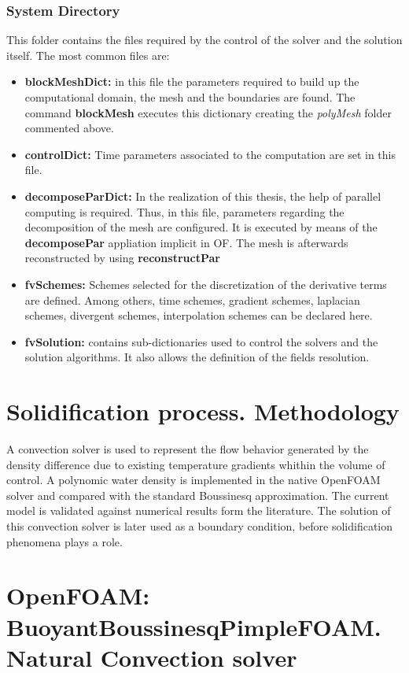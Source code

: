 \subsubsection{System Directory}
This folder contains the files required by the control of the solver and the solution itself. The most common files are:
\begin{itemize}
	\item \textbf{blockMeshDict:} in this file the parameters required to build up the computational domain, the mesh and the boundaries are found. The command \textbf{blockMesh} executes this dictionary creating the \textit{polyMesh} folder commented above.
	\item \textbf{controlDict:} Time parameters associated to the computation are set in this file. 
	\item \textbf{decomposeParDict:} In the realization of this thesis, the help of parallel computing is required. Thus, in this file, parameters regarding the decomposition of the mesh are configured. It is executed by means of the \textbf{decomposePar} appliation implicit in OF. The mesh is afterwards reconstructed by using \textbf{reconstructPar} 
	\item \textbf{fvSchemes:} Schemes selected for the discretization of the derivative terms are defined. Among others, time schemes, gradient schemes, laplacian schemes, divergent schemes, interpolation schemes can be declared here.
	\item \textbf{fvSolution:} contains sub-dictionaries used to control the solvers and the solution algorithms. It also allows the definition of the fields resolution.
\end{itemize}


\section{Solidification process. Methodology}
A convection solver is used to represent the flow behavior generated by the density difference due to existing temperature gradients whithin the volume of control. A polynomic water density is implemented in the native OpenFOAM solver and compared with the standard Boussinesq approximation. The current model is validated against numerical results form the literature. The solution of this convection solver is later used as a boundary condition, before solidification phenomena plays a role.

\newpage
\section{OpenFOAM: BuoyantBoussinesqPimpleFOAM. Natural Convection solver}

